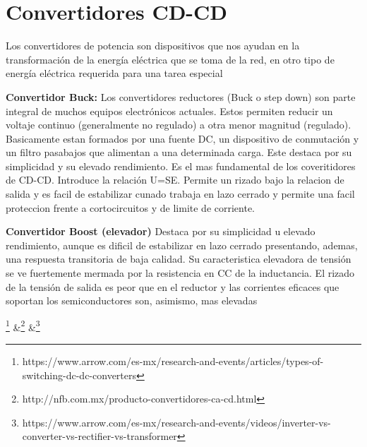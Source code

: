 \documentclass[08pt]{article}
\begin{document}
\section{Convertidores CD-CD} 

Los convertidores de potencia son dispositivos que nos ayudan en la transformación de la energía eléctrica que se toma de la red, en otro tipo de energía eléctrica requerida para una tarea especial

\textbf{Convertidor Buck:} Los convertidores reductores (Buck o step down) son parte integral de muchos equipos electrónicos actuales. Estos permiten reducir un voltaje continuo (generalmente no regulado) a otra menor magnitud (regulado). Basicamente estan formados por una fuente DC, un dispositivo de conmutación y un filtro pasabajos que alimentan a una determinada carga.
Este destaca por su simplicidad y su elevado rendimiento. Es el mas fundamental de los coveritidores de CD-CD. Introduce la relación U=SE. Permite un rizado bajo la relacion de salida y es facil de estabilizar cunado trabaja en lazo cerrado y permite una facil proteccion frente a cortocircuitos y de limite de corriente.

\textbf{Convertidor Boost (elevador)} Destaca por su simplicidad u elevado rendimiento, aunque es dificil de  estabilizar en lazo cerrado presentando, ademas, una respuesta transitoria de baja calidad. Su caracteristica elevadora de tensión se ve fuertemente mermada por la resistencia en CC de la inductancia. El rizado de la tensión de salida es peor que en el reductor y las corrientes eficaces que soportan los semiconductores son, asimismo, mas elevadas


\footnote{https://www.arrow.com/es-mx/research-and-events/articles/types-of-switching-dc-dc-converters} \&\footnote{http://nfb.com.mx/producto-convertidores-ca-cd.html} \&\footnote{https://www.arrow.com/es-mx/research-and-events/videos/inverter-vs-converter-vs-rectifier-vs-transformer}
\end{document}
